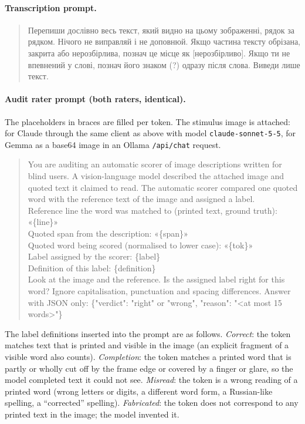 \begin{appendices}
\paragraph{Transcription prompt.}
\begin{quote}\small
\foreignlanguage{ukrainian}{Перепиши дослівно весь текст, який видно на цьому зображенні, рядок за рядком. Нічого не виправляй і не доповнюй. Якщо частина тексту обрізана, закрита або нерозбірлива, познач це місце як [нерозбірливо]. Якщо ти не впевнений у слові, познач його знаком (?) одразу після слова. Виведи лише текст.}
\end{quote}

\paragraph{Audit rater prompt (both raters, identical).} The placeholders in braces are filled per token. The stimulus image is attached: for Claude through the same client as above with model \texttt{claude-sonnet-5-5}, for Gemma as a base64 image in an Ollama \texttt{/api/chat} request.
\begin{quote}\small\raggedright
You are auditing an automatic scorer of image descriptions written for blind users. A vision-language model described the attached image and quoted text it claimed to read. The automatic scorer compared one quoted word with the reference text of the image and assigned a label.\\
Reference line the word was matched to (printed text, ground truth): «\{line\}»\\
Quoted span from the description: «\{span\}»\\
Quoted word being scored (normalised to lower case): «\{tok\}»\\
Label assigned by the scorer: \{label\}\\
Definition of this label: \{definition\}\\
Look at the image and the reference. Is the assigned label right for this word? Ignore capitalisation, punctuation and spacing differences. Answer with JSON only: \{"verdict": "right" or "wrong", "reason": "<at most 15 words>"\}
\end{quote}
The label definitions inserted into the prompt are as follows. \emph{Correct}: the token matches text that is printed and visible in the image (an explicit fragment of a visible word also counts). \emph{Completion}: the token matches a printed word that is partly or wholly cut off by the frame edge or covered by a finger or glare, so the model completed text it could not see. \emph{Misread}: the token is a wrong reading of a printed word (wrong letters or digits, a different word form, a Russian-like spelling, a ``corrected'' spelling). \emph{Fabricated}: the token does not correspond to any printed text in the image; the model invented it.


\end{appendices}
